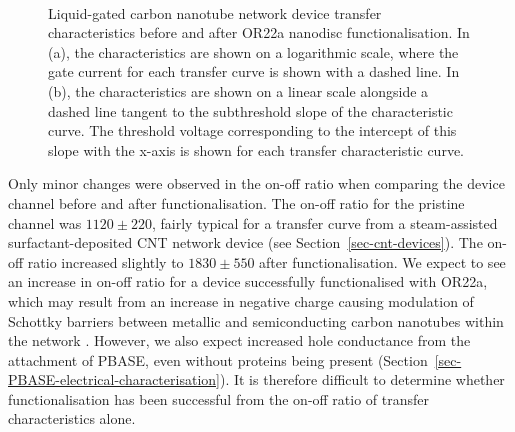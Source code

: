 \documentclass[
  a4paper,
]{scrbook}
\begin{document}
\begin{figure}
\begin{minipage}[t]{0.45\linewidth}
{{}

}

\end{minipage}%
%
\begin{minipage}[t]{0.01\linewidth}

{\centering 

~

}

\end{minipage}%

\caption{\label{fig-OR22a-TX-comparison}Liquid-gated carbon nanotube
network device transfer characteristics before and after OR22a nanodisc
functionalisation. In (a), the characteristics are shown on a
logarithmic scale, where the gate current for each transfer curve is
shown with a dashed line. In (b), the characteristics are shown on a
linear scale alongside a dashed line tangent to the subthreshold slope
of the characteristic curve. The threshold voltage corresponding to the
intercept of this slope with the x-axis is shown for each transfer
characteristic curve.}

\end{figure}

Only minor changes were observed in the on-off ratio when comparing the
device channel before and after functionalisation. The on-off ratio for
the pristine channel was \(1120\pm220\), fairly typical for a transfer
curve from a steam-assisted surfactant-deposited CNT network device (see
Section~\ref{sec-cnt-devices}). The on-off ratio increased slightly to
\(1830\pm550\) after functionalisation. We expect to see an increase in
on-off ratio for a device successfully functionalised with OR22a, which
may result from an increase in negative charge causing modulation of
Schottky barriers between metallic and semiconducting carbon nanotubes
within the network \autocite{Murugathas2019b}. However, we also expect
increased hole conductance from the attachment of PBASE, even without
proteins being present
(Section~\ref{sec-PBASE-electrical-characterisation}). It is therefore
difficult to determine whether functionalisation has been successful
from the on-off ratio of transfer characteristics alone.
\end{document}
